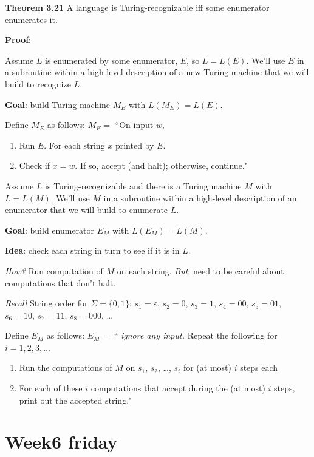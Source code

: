 \documentclass[12pt, oneside]{article}
\begin{document}
\newpage

{\bf Theorem 3.21} A language is Turing-recognizable iff some enumerator enumerates it.

{\bf Proof}:

Assume $L$ is enumerated by some enumerator, $E$, so $L = L(E)$.
We'll use $E$ in a subroutine
within a high-level description of a new Turing machine that we will build to recognize $L$.

{\bf Goal}: build Turing machine $M_E$ with $L(M_E) = L(E)$.

Define $M_E$ as follows: $M_E = $ ``On input $w$,
\begin{enumerate}
\item Run $E$. For each string $x$ printed by $E$.
\item \qquad Check if $x = w$. If so, accept (and halt); otherwise, continue."
\end{enumerate}


\vfill 



Assume $L$ is Turing-recognizable and there 
is a Turing  machine  $M$ with  $L = L(M)$. We'll use $M$ in a subroutine
within a high-level description of an enumerator that we will build to enumerate $L$.

{\bf Goal}: build enumerator $E_M$ with $L(E_M) = L(M)$.

{\bf Idea}: check each string in turn to see if it is in $L$.

{\it How?} Run computation of $M$ on each string.  {\it But}: need to be careful 
about computations that don't halt.

{\it Recall} String order for $\Sigma = \{0,1\}$: $s_1 = \varepsilon$, $s_2 = 0$, $s_3 = 1$, $s_4 = 00$, $s_5 = 01$, $s_6  = 10$, 
$s_7  =  11$, $s_8 = 000$, \ldots

Define $E_M$ as follows: $E_{M} = $ `` {\it ignore any input.} Repeat the following for $i=1, 2, 3, \ldots$
\begin{enumerate}
  \item Run the computations of $M$ on $s_1$, $s_2$, \ldots, $s_i$ for (at most) $i$ steps each
  \item For each of these $i$ computations that accept during the (at most) $i$ steps, print
  out the accepted string."
\end{enumerate}
 \vfill
\section*{Week6 friday}
\end{document}
